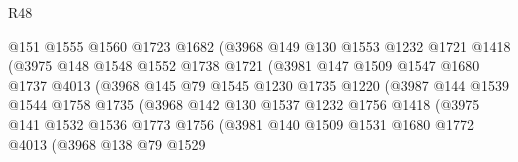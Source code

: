 \begin{lexlean}{R48}
\begin{coremodule}
                            @151
                            @1555
                            @1560
                            @1723
                            @1682
                            (@3968
                              @149
                              @130
                              @1553
                              @1232
                              @1721
                              @1418
                              (@3975
                                @148
                                @1548
                                @1552
                                @1738
                                @1721
                                (@3981
                                  @147
                                  @1509
                                  @1547
                                  @1680
                                  @1737
                                  @4013
                                  (@3968
                                    @145
                                    @79
                                    @1545
                                    @1230
                                    @1735
                                    @1220
                                    (@3987
                                      @144
                                      @1539
                                      @1544
                                      @1758
                                      @1735
                                      (@3968
                                        @142
                                        @130
                                        @1537
                                        @1232
                                        @1756
                                        @1418
                                        (@3975
                                          @141
                                          @1532
                                          @1536
                                          @1773
                                          @1756
                                          (@3981
                                            @140
                                            @1509
                                            @1531
                                            @1680
                                            @1772
                                            @4013
                                            (@3968
                                              @138
                                              @79
                                              @1529

\end{coremodule}
\end{lexlean}
